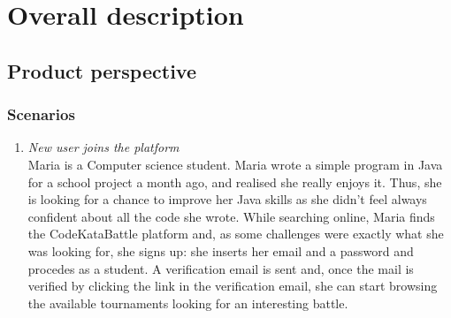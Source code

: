 \documentclass[12pt, a4paper]{report}
\begin{document}
\newpage 

\chapter{Overall description}
    \section{Product perspective}
    \subsection{Scenarios}
    \begin{enumerate}
        \item \textit{New user joins the platform}\\
            Maria is a Computer science student. Maria wrote a simple program in Java for a school project a month ago, and realised she really enjoys it. 
            Thus, she is looking for a chance to improve her Java skills as she didn't feel always confident about all the code she wrote.
            While searching online, Maria finds the CodeKataBattle platform and, as some challenges were exactly what she was looking for, she signs up: she inserts her email and a password and procedes as a student.
            A verification email is sent and, once the mail is verified by clicking the link in the verification email, she can start browsing the available tournaments looking for an interesting battle.
        

\end{enumerate}
\end{document}
